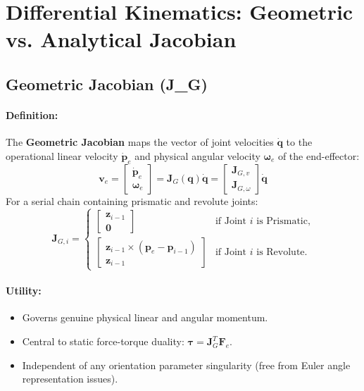 \documentclass[11pt, a4paper]{article}
\begin{document}
\section{Differential Kinematics: Geometric vs. Analytical Jacobian}
\subsection{Geometric Jacobian (J\_G)}
\paragraph{Definition:} The \textbf{Geometric Jacobian} maps the vector of joint velocities $\mathbf{\dot{q}}$ to the operational linear velocity $\mathbf{\dot{p}}_e$ and physical angular velocity $\boldsymbol{\omega}_e$ of the end-effector:
\begin{equation}
    \mathbf{v}_e = \begin{bmatrix} \mathbf{\dot{p}}_e \\ \boldsymbol{\omega}_e \end{bmatrix} = \mathbf{J}_G(\mathbf{q})\mathbf{\dot{q}} = 
    \begin{bmatrix} \mathbf{J}_{G,v} \\ \mathbf{J}_{G,\omega} \end{bmatrix}\mathbf{\dot{q}}
\end{equation}
For a serial chain containing prismatic and revolute joints:
\begin{equation}
    \mathbf{J}_{G,i} = 
    \begin{cases}
        \begin{bmatrix} \mathbf{z}_{i-1} \\ \mathbf{0} \end{bmatrix} & \text{if Joint $i$ is Prismatic,} \\[10pt]
        \begin{bmatrix} \mathbf{z}_{i-1} \times (\mathbf{p}_e - \mathbf{p}_{i-1}) \\ \mathbf{z}_{i-1} \end{bmatrix} & \text{if Joint $i$ is Revolute.}
    \end{cases}
\end{equation}

\paragraph{Utility:}
\begin{itemize}
    \item Governs genuine physical linear and angular momentum.
    \item Central to static force-torque duality: $\boldsymbol{\tau} = \mathbf{J}_G^T \mathbf{F}_e$.
    \item Independent of any orientation parameter singularity (free from Euler angle representation issues).
\end{itemize}
\end{document}
